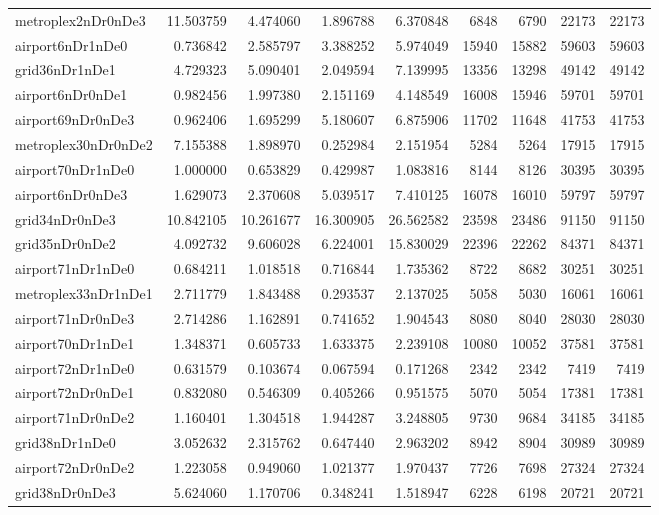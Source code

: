 \begin{longtable}{|l|r|r|r|r|r|r|r|r|}
metroplex2nDr0nDe3 & 11.503759 & 4.474060 & 1.896788 & 6.370848 & 6848 & 6790 & 22173 & 22173 \\
airport6nDr1nDe0 & 0.736842 & 2.585797 & 3.388252 & 5.974049 & 15940 & 15882 & 59603 & 59603 \\
grid36nDr1nDe1 & 4.729323 & 5.090401 & 2.049594 & 7.139995 & 13356 & 13298 & 49142 & 49142 \\
airport6nDr0nDe1 & 0.982456 & 1.997380 & 2.151169 & 4.148549 & 16008 & 15946 & 59701 & 59701 \\
airport69nDr0nDe3 & 0.962406 & 1.695299 & 5.180607 & 6.875906 & 11702 & 11648 & 41753 & 41753 \\
metroplex30nDr0nDe2 & 7.155388 & 1.898970 & 0.252984 & 2.151954 & 5284 & 5264 & 17915 & 17915 \\
airport70nDr1nDe0 & 1.000000 & 0.653829 & 0.429987 & 1.083816 & 8144 & 8126 & 30395 & 30395 \\
airport6nDr0nDe3 & 1.629073 & 2.370608 & 5.039517 & 7.410125 & 16078 & 16010 & 59797 & 59797 \\
grid34nDr0nDe3 & 10.842105 & 10.261677 & 16.300905 & 26.562582 & 23598 & 23486 & 91150 & 91150 \\
grid35nDr0nDe2 & 4.092732 & 9.606028 & 6.224001 & 15.830029 & 22396 & 22262 & 84371 & 84371 \\
airport71nDr1nDe0 & 0.684211 & 1.018518 & 0.716844 & 1.735362 & 8722 & 8682 & 30251 & 30251 \\
metroplex33nDr1nDe1 & 2.711779 & 1.843488 & 0.293537 & 2.137025 & 5058 & 5030 & 16061 & 16061 \\
airport71nDr0nDe3 & 2.714286 & 1.162891 & 0.741652 & 1.904543 & 8080 & 8040 & 28030 & 28030 \\
airport70nDr1nDe1 & 1.348371 & 0.605733 & 1.633375 & 2.239108 & 10080 & 10052 & 37581 & 37581 \\
airport72nDr1nDe0 & 0.631579 & 0.103674 & 0.067594 & 0.171268 & 2342 & 2342 & 7419 & 7419 \\
airport72nDr0nDe1 & 0.832080 & 0.546309 & 0.405266 & 0.951575 & 5070 & 5054 & 17381 & 17381 \\
airport71nDr0nDe2 & 1.160401 & 1.304518 & 1.944287 & 3.248805 & 9730 & 9684 & 34185 & 34185 \\
grid38nDr1nDe0 & 3.052632 & 2.315762 & 0.647440 & 2.963202 & 8942 & 8904 & 30989 & 30989 \\
airport72nDr0nDe2 & 1.223058 & 0.949060 & 1.021377 & 1.970437 & 7726 & 7698 & 27324 & 27324 \\
grid38nDr0nDe3 & 5.624060 & 1.170706 & 0.348241 & 1.518947 & 6228 & 6198 & 20721 & 20721 \\

\end{longtable}
